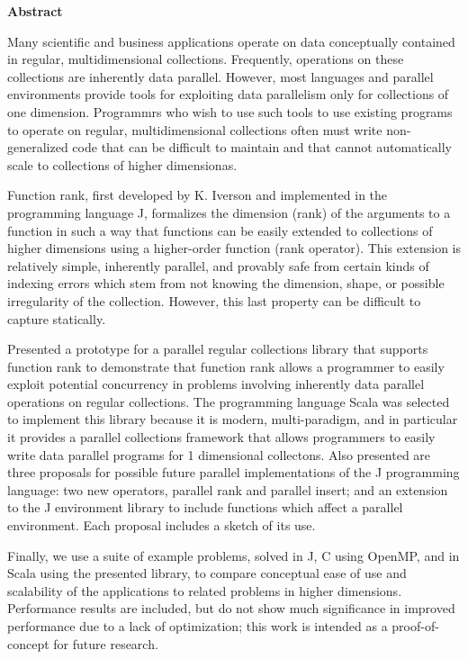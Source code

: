 \begin{center}

\bigskip

\begin{Large}
\textbf{\theTitle}
\end{Large}

\bigskip

\begin{large}
\theAuthor
\end{large}

\bigskip
\bigskip

\textbf{Abstract}

\end{center}

\noindent
Many scientific and business applications operate on 
data conceptually contained in regular, multidimensional collections.
Frequently, operations on these collections are inherently data parallel.
However, most languages and parallel environments 
provide tools for exploiting data parallelism only for collections of one dimension.
Programmrs who wish to use such tools to use existing programs to operate on regular, multidimensional collections
often must write non-generalized code that can be difficult to maintain and 
that cannot automatically scale to collections of higher dimensionas.

Function rank, first developed by K. Iverson and implemented in the programming language J, 
formalizes the dimension (rank) of the arguments to a function in such a way 
that functions can be easily extended to collections of higher dimensions using a higher-order function (rank operator).
This extension is relatively simple, inherently parallel, and provably safe 
from certain kinds of indexing errors which stem from not knowing the dimension, shape, or possible irregularity of the collection.
However, this last property can be difficult to capture statically.

Presented a prototype for a parallel regular collections library that supports function rank 
to demonstrate that function rank allows a programmer to easily exploit potential concurrency 
in problems involving inherently data parallel operations on regular collections.
The programming language Scala was selected to implement this library because it is modern, multi-paradigm, 
and in particular it provides a parallel collections framework that 
allows programmers to easily write data parallel programs for 1 dimensional collectons.
Also presented are three proposals for possible future parallel implementations of the J programming language:
two new operators, parallel rank and parallel insert;
and an extension to the J environment library to include functions which affect a parallel environment.
Each proposal includes a sketch of its use.

Finally, we use a suite of example problems, 
solved in J, C using OpenMP, and in Scala using the presented library, 
to compare conceptual ease of use and scalability of the applications to related problems in higher dimensions.
Performance results are included, but do not show much significance in improved performance 
due to a lack of optimization; this work is intended as a proof-of-concept for future research.
